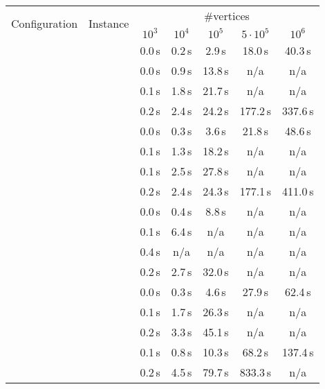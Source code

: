 \begin{table}
	\centering
	\small
	\begin{tabular}{|l|l|ccccc|}
		\hline
		\multirow{2}{*}{Configuration} & \multirow{2}{*}{Instance} & \multicolumn{5}{|c|}{\#vertices} \\
		& & $10^3$ & $10^4$ & $10^5$ & $5 \cdot 10^5$ & $10^6$ \\
		\hline
		\hline
		\multirow{4}{*}{\vdefault}
			& \walk           &   0.0\,s &   0.2\,s &   2.9\,s &  18.0\,s &  40.3\,s \\
			& \sinewalk       &   0.0\,s &   0.9\,s &  13.8\,s &      n/a &      n/a \\
			& \parabolawalk   &   0.1\,s &   1.8\,s &  21.7\,s &      n/a &      n/a \\
			& \concavevalleys &   0.2\,s &   2.4\,s &  24.2\,s & 177.2\,s & 337.6\,s \\
		\hline
		\multirow{4}{*}{\vnodom}
			& \walk           &   0.0\,s &   0.3\,s &   3.6\,s &  21.8\,s &  48.6\,s \\
			& \sinewalk       &   0.1\,s &   1.3\,s &  18.2\,s &      n/a &      n/a \\
			& \parabolawalk   &   0.1\,s &   2.5\,s &  27.8\,s &      n/a &      n/a \\
			& \concavevalleys &   0.2\,s &   2.4\,s &  24.3\,s & 177.1\,s & 411.0\,s \\
		\hline
		\multirow{4}{*}{\vnow}
			& \walk           &   0.0\,s &   0.4\,s &   8.8\,s &      n/a &      n/a \\
			& \sinewalk       &   0.1\,s &   6.4\,s &      n/a &      n/a &      n/a \\
			& \parabolawalk   &   0.4\,s &      n/a &      n/a &      n/a &      n/a \\
			& \concavevalleys &   0.2\,s &   2.7\,s &  32.0\,s &      n/a &      n/a \\
		\hline
		\hline
		\multirow{4}{*}{\pdefault}
			& \walk           &   0.0\,s &   0.3\,s &   4.6\,s &  27.9\,s &  62.4\,s \\
			& \sinewalk       &   0.1\,s &   1.7\,s &  26.3\,s &      n/a &      n/a \\
			& \parabolawalk   &   0.2\,s &   3.3\,s &  45.1\,s &      n/a &      n/a \\
			& \concavevalleys &   0.1\,s &   0.8\,s &  10.3\,s &  68.2\,s & 137.4\,s \\
		\hline
		\multirow{4}{*}{\pnoedge}
			& \walk           &   0.2\,s &   4.5\,s &  79.7\,s & 833.3\,s &      n/a \\

\end{tabular}
\end{table}
